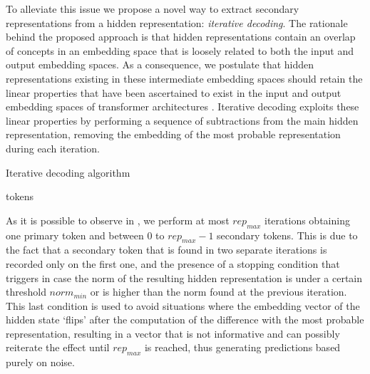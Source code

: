 To alleviate this issue we propose a novel way to extract secondary representations from a hidden representation: \emph{iterative decoding}.
The rationale behind the proposed approach is that hidden representations contain an overlap of concepts in an embedding space that is loosely related to both the input and output embedding spaces.
As a consequence, we postulate that hidden representations existing in these intermediate embedding spaces should retain the linear properties that have been ascertained to exist in the input and output embedding spaces of transformer architectures .
Iterative decoding exploits these linear properties by performing a sequence of subtractions from the main hidden representation, removing the embedding of the most probable representation during each iteration.
\begin{algorithm}[H]
    \caption{Iterative decoding algorithm}\label{alg:method_intravisto_iter-dec}
    \begin{algorithmic}
            \ENDIF{}
            \ENDIF{}
        \ENDWHILE{}
        \RETURN tokens
    \end{algorithmic}
\end{algorithm}
As it is possible to observe in , we perform at most ${rep}_{max}$ iterations obtaining one primary token and between $0$ to ${rep}_{max} - 1$ secondary tokens.
This is due to the fact that a secondary token that is found in two separate iterations is recorded only on the first one, and the presence of a stopping condition that triggers in case the norm of the resulting hidden representation is under a certain threshold ${norm}_{min}$ or is higher than the norm found at the previous iteration.
This last condition is used to avoid situations where the embedding vector of the hidden state `flips' after the computation of the difference with the most probable representation, resulting in a vector that is not informative and can possibly reiterate the effect until ${rep}_{max}$ is reached, thus generating predictions based purely on noise. 

